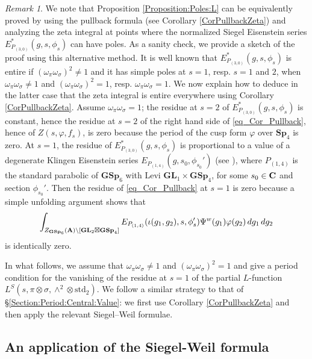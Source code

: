 \documentclass[11pt, reqno]{amsart}
\theoremstyle{plain}
\theoremstyle{definition}
\theoremstyle{remark}
\newtheorem{remark}[theorem]{Remark}
\theoremstyle{plain}
\def\C{{\bf C}}
\def\A{{\bf A}}
\def\GSp{{\mathbf{GSp}}}
\def\Sp{{\mathbf{Sp}}}
\def\GL{\mathbf{GL}}
\begin{document}
\begin{remark}
   We note that Proposition \ref{Proposition:Poles:L} can be equivalently proved by using the pullback formula (see Corollary \ref{CorPullbackZeta}) and analyzing the zeta integral at points where the normalized Siegel Eisenstein series $E_{P_{(3,0)}}^*(g, s,\phi_s)$ can have poles. As a sanity check, we provide a sketch of the proof using this alternative method. It is well known that  $E_{P_{(3,0)}}^*(g, s,\phi_s)$ is entire if $(\omega_{\pi}\omega_{\sigma})^2 \ne 1$ and it has simple poles at $s=1$, resp. $s=1$ and $2$, when  $\omega_{\pi}\omega_{\sigma} \ne 1$ and $(\omega_{\pi}\omega_{\sigma})^2=1$, resp. $\omega_{\pi}\omega_{\sigma} = 1$. We now explain how to deduce in the latter case that the zeta integral is entire everywhere using Corollary \ref{CorPullbackZeta}. Assume $\omega_{\pi}\omega_{\sigma} = 1$; the residue at $s=2$ of $E_{P_{(3,0)}}^*(g, s,\phi_s)$ is constant, hence the residue at $s=2$ of the right hand side of \eqref{eq_Cor_Pullback}, hence of $Z(s,\varphi,f_s)$, is zero because the period of the cusp form $\varphi$ over $\Sp_4$ is zero. At $s=1$, the residue of $E_{P_{(3,0)}}^*(g, s,\phi_s)$ is proportional to a value of a degenerate Klingen Eisenstein series $E_{P_{(1,4)}}(g, s_0,\phi_{s_0}')$  (see \cite[Proposition 1.10]{IkedaTriple}), where $P_{(1,4)}$ is the standard parabolic of $\GSp_6$ with Levi $\GL_1 \times \GSp_4$, for some $s_0 \in \C$ and section $\phi_{s_0}'$. Then the residue of \eqref{eq_Cor_Pullback} at $s=1$ is zero because a simple unfolding argument shows that 
   $$\int_{Z_{\GSp_6}(\A)\backslash [\GL_2\boxtimes \GSp_4]} E_{P_{(1,4)}}(\iota( g_1  , g_2), s,\phi_{s}') \Psi^w( g_1  ) \varphi(g_2)\, dg_1\,dg_2$$
   is identically zero. 
\end{remark}

In what follows, we assume that  $\omega_{\pi}\omega_{\sigma}\neq 1$ and $(\omega_{\pi}\omega_{\sigma})^2 = 1$ and give a period condition for the vanishing of the residue at $s = 1$ of the partial $L$-function $L^S(s,\pi \otimes \sigma, \wedge^2 \otimes  \mathrm{std}_2)$. We follow a similar strategy to that of \S\ref{Section:Period:Central:Value}: we first use Corollary \ref{CorPullbackZeta} and then apply the relevant Siegel--Weil formulae. 


\subsection{An application of the Siegel-Weil formula}\label{SW:FirstTerm:Pole}
\end{document}
